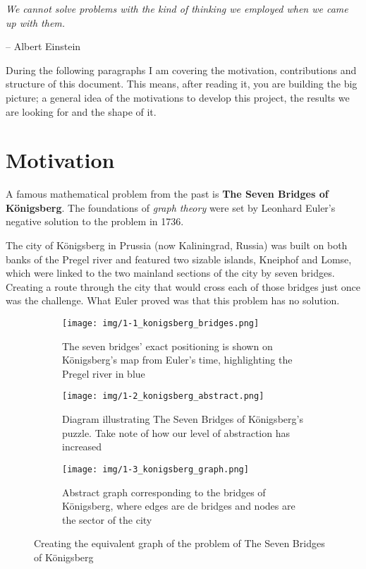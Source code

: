 \epigraph{\textit{We cannot solve problems with the kind of thinking we employed when we came up with them.}}{-- \textup{Albert Einstein}}

During the following paragraphs I am covering the motivation, contributions and structure of this document. This means, after reading it, you are building the big picture; a general idea of the motivations to develop this project, the results we are looking for and the shape of it.

\section{Motivation}

A famous mathematical problem from the past is \textbf{The Seven Bridges of Königsberg}. The foundations of \textit{graph theory} were set by Leonhard Euler's negative solution to the problem in 1736.

The city of Königsberg in Prussia (now Kaliningrad, Russia) was built on both banks of the Pregel river and featured two sizable islands, Kneiphof and Lomse, which were linked to the two mainland sections of the city by seven bridges. Creating a route through the city that would cross each of those bridges just once was the challenge. What Euler proved was that this problem has no solution.

\begin{figure}[ht]
    \begin{subfigure}{.3\textwidth}
        \centering
        \texttt{[image: img/1-1\_konigsberg\_bridges.png]}
        \caption{The seven bridges' exact positioning is shown on Königsberg's map from Euler's time, highlighting the Pregel river in blue}
    \end{subfigure}%
    \hspace*{0.5em}
    \begin{subfigure}{.3\textwidth}
        \centering
        \texttt{[image: img/1-2\_konigsberg\_abstract.png]}
        \caption{Diagram illustrating The Seven Bridges of Königsberg's puzzle. Take note of how our level of abstraction has increased}
    \end{subfigure}%
    \hspace*{0.5em}
    \begin{subfigure}{.3\textwidth}
        \centering
        \texttt{[image: img/1-3\_konigsberg\_graph.png]}
        \caption{Abstract graph corresponding to the bridges of Königsberg, where edges are de bridges and nodes are the sector of the city}
    \end{subfigure}%
    \caption[Creating the equivalent graph of the problem of The Seven Bridges of Königsberg]{Creating the equivalent graph of the problem of The Seven Bridges of Königsberg\footnotemark}
\end{figure}

